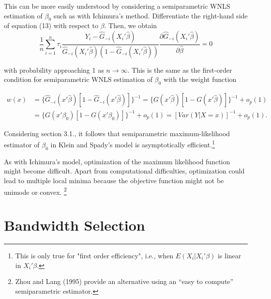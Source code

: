 \documentclass[a4paper]{article}
\begin{document}


This can be more easily understood by considering a semiparametric WNLS estimation of $\beta_0$ such as with Ichimura's method. Differentiate the right-hand side of equation (13) with respect to $\beta$. Then, we obtain
\begin{equation}
\frac{1}{n} \sum_{i=1}^n \tau_i \frac{Y_i - \hat{G}_{-i}(X_i'\hat{\beta})}{\hat{G}_{-i}(X_i'\hat{\beta})(1 - \hat{G}_{-i}(X_i'\hat{\beta}))} \frac{\partial\hat{G}_{-i}(X_i'\hat{\beta})}{\partial \hat{\beta}} = 0
\end{equation} 

with probability approaching 1 as $n \rightarrow \infty$. This is the same as the first-order condition for semiparametric WNLS estimation of $\beta_0$ with the weight function

\begin{align*}
w(x) & = \{ \hat{G}_{-i}(x'\hat{\beta})[ 1 - \hat{G}_{-i}(x'\hat{\beta})]\}^{-1} = \{ G(x'\hat{\beta})[ 1 - G(x'\hat{\beta})]\}^{-1} + o_p(1) \\
     & = \{ G(x'\beta_0)[ 1 - G(x'\beta_0)]\}^{-1} + o_p(1) = [Var(Y|X = x)]^{-1} + o_p(1).
\end{align*}


Considering section 3.1., it follows that semiparametric maximum-likelihood estimator of $\beta_0$ in Klein and Spady's model is asymptotically efficient.\footnote{This is only true for "first order efficiency", i.e., when $E(X_i|X_i'\beta)$ is linear in $X_i'\beta$.}

As with Ichimura's model, optimization of the maximum likelihood function might become difficult. Apart from computational difficulties, optimization could lead to multiple local minima because the objective function might not be unimode or convex. \footnote{Zhou and Lang (1995) provide an alternative using an ``easy to compute'' semiparametric estimator.}

\section{Bandwidth Selection} %
\label{sec:Bandwidth Selection}


\newpage 


\end{document}
